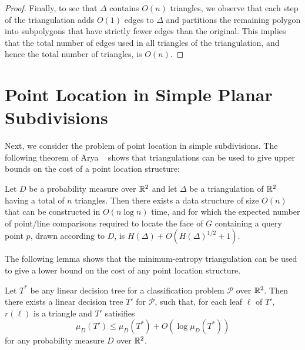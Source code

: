 \documentclass[lotsofwhite]{patmorin}
\begin{document}
\begin{proof}
Finally, to see that $\Delta$ contains $O(n)$ triangles, we observe
that each step of the triangulation adds $O(1)$ edges to $\Delta$ and
partitions the remaining polygon into subpolygons that have strictly
fewer edges than the original.  This implies that the total number of
edges used in all triangles of the triangulation, and hence the total
number of triangles, is $O(n)$.
\end{proof}

\section{Point Location in Simple Planar Subdivisions}

Next, we consider the problem of point location in simple
subdivisions.  The following theorem of Arya \etal\ \cite{ammw07}
shows that triangulations can be used to give upper bounds on the cost
of a point location structure:

\begin{thm}
Let $D$ be a probability measure over $\mathbb{R}^2$ and let $\Delta$ be a
triangulation of $\mathbb{R}^2$ having a total of $n$ triangles.  Then there exists a
data structure of size $O(n)$ that can be constructed in $O(n\log n)$
time, and for which the expected number of point/line comparisons
required to locate the face of $G$ containing a query point $p$, drawn
according to $D$, is $H(\Delta) + O(H(\Delta)^{1/2}+1)$.
\end{thm}

The following lemma shows that the minimum-entropy triangulation can
be used to give a lower bound on the cost of any point location
structure.

\begin{lem}
Let $T^*$ be any linear decision tree for a classification problem
$\mathcal{P}$ over $\mathbb{R}^2$.  Then there exists a linear decision tree
$T'$ for $\mathcal{P}$, such that, for each leaf $\ell$ of $T'$,
$r(\ell)$ is a triangle and $T'$ satisifies
\[
    \mu_D(T') \le \mu_D(T^*) + O(\log\mu_D(T^*))
\]
for any probability measure $D$ over $\mathbb{R}^2$.
\end{lem}
\end{document}
